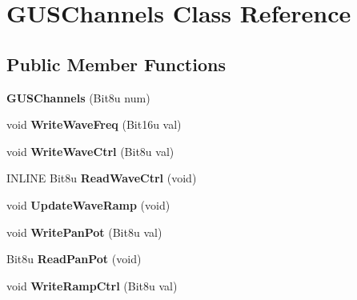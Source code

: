 \hypertarget{classGUSChannels}{\section{G\-U\-S\-Channels Class Reference}
\label{classGUSChannels}
}
\subsection*{Public Member Functions}
\begin{DoxyCompactItemize}
\item 
\hypertarget{classGUSChannels_aaa10e07b1ed3872ddb5e2db6e558e432}{{\bfseries G\-U\-S\-Channels} (Bit8u num)}\label{classGUSChannels_aaa10e07b1ed3872ddb5e2db6e558e432}

\item 
\hypertarget{classGUSChannels_a2e83b5fc88f260c2504b6e9011144e34}{void {\bfseries Write\-Wave\-Freq} (Bit16u val)}\label{classGUSChannels_a2e83b5fc88f260c2504b6e9011144e34}

\item 
\hypertarget{classGUSChannels_a1d1ae0ebc77e3958ce5e37b3cf2468dc}{void {\bfseries Write\-Wave\-Ctrl} (Bit8u val)}\label{classGUSChannels_a1d1ae0ebc77e3958ce5e37b3cf2468dc}

\item 
\hypertarget{classGUSChannels_a45ca712a5e0e1964e39f64da757f7421}{I\-N\-L\-I\-N\-E Bit8u {\bfseries Read\-Wave\-Ctrl} (void)}\label{classGUSChannels_a45ca712a5e0e1964e39f64da757f7421}

\item 
\hypertarget{classGUSChannels_a991170f0ee90862e983266eb368d32b7}{void {\bfseries Update\-Wave\-Ramp} (void)}\label{classGUSChannels_a991170f0ee90862e983266eb368d32b7}

\item 
\hypertarget{classGUSChannels_ad5ef507b7016d955efd1482ca40bea80}{void {\bfseries Write\-Pan\-Pot} (Bit8u val)}\label{classGUSChannels_ad5ef507b7016d955efd1482ca40bea80}

\item 
\hypertarget{classGUSChannels_a95be72c2edb80f462e55fa34d5bbfb0c}{Bit8u {\bfseries Read\-Pan\-Pot} (void)}\label{classGUSChannels_a95be72c2edb80f462e55fa34d5bbfb0c}

\item 
\hypertarget{classGUSChannels_a51d38575b34383d7775f10cb48b8d1dc}{void {\bfseries Write\-Ramp\-Ctrl} (Bit8u val)}\label{classGUSChannels_a51d38575b34383d7775f10cb48b8d1dc}


\end{DoxyCompactItemize}
